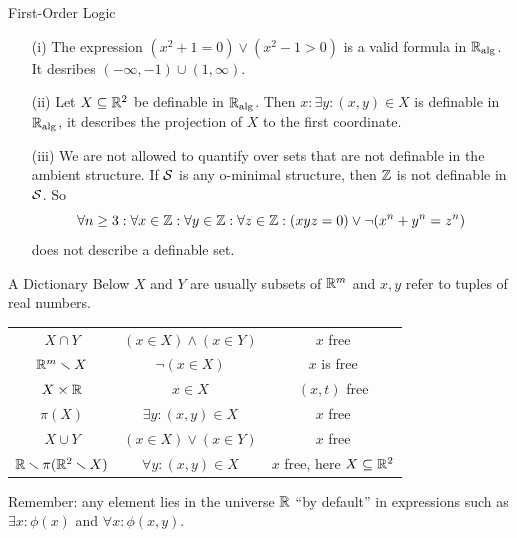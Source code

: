 \documentclass{beamer}
\begin{document}
\begin{frame}{First-Order Logic}
  \begin{example}
    \begin{enumerate}
    \item [(i)] The expression $(x^2+1=0)\vee(x^2-1>0)$ is a valid
      formula in ${\mathbb{R}}_{\mathrm{alg}}$. It desribes $(-\infty,-1)\cup(1,\infty)$.
    \item[(ii)] Let $X\subseteq{\mathbb{R}}^2$ be definable in ${\mathbb{R}}_{\mathrm{alg}}$. Then
      $x : \exists y : (x,y)\in X$ is definable in ${\mathbb{R}}_{\mathrm{alg}}$, it
      describes the projection of $X$ to the first coordinate. 
    \item[(iii)]
      We are not \alert{allowed} to quantify over sets that are not definable in
      the ambient structure. If ${\mathcal S}$ is any o-minimal
      structure, then ${\mathbb{Z}}$ is not definable in ${\mathcal S}$. So 
      $$\forall n\ge 3: \forall x \in{\mathbb{Z}}:\forall y\in{\mathbb{Z}} :\forall z\in {\mathbb{Z}} :
      (xyz=0) \vee \neg(x^n+y^n=z^n)$$
      does not describe a definable set.
      
    \end{enumerate}
  \end{example}
\end{frame}

\begin{frame}{A Dictionary}
  Below $X$ and $Y$ are usually subsets of ${\mathbb{R}}^m$ and $x,y$ refer to
  tuples of real numbers. 
  \begin{center}
    \begin{tabular}{c|c|c}
      $X\cap Y$  & $(x\in X)\wedge (x\in Y)$ &
                                                                                                 $x$  free\\
      ${\mathbb{R}}^m\smallsetminus X$  &  $\neg(x\in X)$ & $x$ is free \\
      $X\times{\mathbb{R}}$  & $x\in X$&
                                                                   $(x,t)$
                                                                    free\\
      $\pi(X)$  &$\exists y : (x,y)\in
                                      X$  & $x$  free
      \\  
      $X\cup Y$ & $( x\in X)\vee (x\in Y)$ &
                                                                                               $x$
                                             free\\
      ${\mathbb{R}}\smallsetminus \pi({\mathbb{R}}^2\smallsetminus X)$ & $\forall y : (x,y)\in X$ & $x$
                                                              free,
                                                              here $X\subseteq{\mathbb{R}}^2$
                                             
    \end{tabular}
  \end{center}
  Remember:  any element  lies in the universe ${\mathbb{R}}$  ``by default'' in expressions
  such as $\exists x:\phi(x)$ and $\forall x:\phi(x,y)$.
\end{frame}
\end{document}

